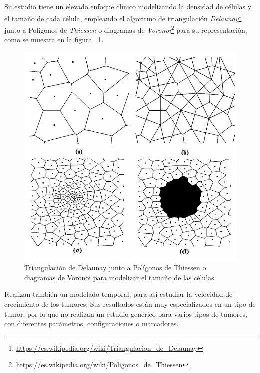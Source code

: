 Su estudio tiene un elevado enfoque clínico modelizando la densidad de células y
el tamaño de cada célula, empleando el algoritmo de triangulación \textit{Delaunay}\footnote{\url{https://es.wikipedia.org/wiki/Triangulacion_de_Delaunay}}
junto a Polígonos de \textit{Thiessen} o diagramas de \textit{Voronoi}\footnote{\url{https://es.wikipedia.org/wiki/Poligonos_de_Thiessen}} para su representación,
como se muestra en la figura ~\ref{fig:delaunay}.

\begin{figure}[h]
\centering
\includegraphics[scale=0.7]{figures/modelado_tamanio}
\caption{Triangulación de Delaunay junto a Polígonos de Thiessen o diagramas de Voronoi para modelizar el tamaño de las células.}
\label{fig:delaunay}
\end{figure}

Realizan también un modelado temporal, para así estudiar la velocidad de crecimiento de los tumores.
Sus resultados están muy especializados en un tipo de tumor, por lo que no realizan un estudio genérico
para varios tipos de tumores, con diferentes parámetros, configuraciones o marcadores.
